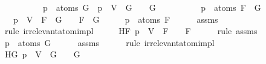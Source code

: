 \begin{isabellebody}
\ \ \ \ \ \ \ \ \ \ {\isachardoublequoteopen}p\ {\isasymnotin}\ atoms\ G\ {\isasymLongrightarrow}\ {\isasymA}{\isacharparenleft}p\ {\isacharcolon}{\isacharequal}\ V{\isacharparenright}\ {\isasymTurnstile}\ G\ {\isasymlongleftrightarrow}\ {\isasymA}\ {\isasymTurnstile}\ G{\isachardoublequoteclose}\isanewline
\ \ \ \ \ \ \ \ \ \ {\isachardoublequoteopen}p\ {\isasymnotin}\ atoms\ {\isacharparenleft}F\ \isactrlbold {\isasymrightarrow}\ G{\isacharparenright}{\isachardoublequoteclose}\isanewline
\ \ \ {\isachardoublequoteopen}{\isasymA}{\isacharparenleft}p\ {\isacharcolon}{\isacharequal}\ V{\isacharparenright}\ {\isasymTurnstile}\ {\isacharparenleft}F\ \isactrlbold {\isasymrightarrow}\ G{\isacharparenright}\ {\isasymlongleftrightarrow}\ {\isasymA}\ {\isasymTurnstile}\ {\isacharparenleft}F\ \isactrlbold {\isasymrightarrow}\ G{\isacharparenright}{\isachardoublequoteclose}\isanewline
%
\isadelimproof
%
\endisadelimproof
%
\isatagproof
{}\isamarkupfalse%
\ {\isacharminus}\isanewline
\ \ \isamarkupfalse%
\ {\isachardoublequoteopen}p\ {\isasymnotin}\ atoms\ F{\isachardoublequoteclose}\isanewline
\ \ \ \ \isamarkupfalse%
\ assms{\isacharparenleft}{}{\isacharparenright}\isanewline
\ \ \ \ \isamarkupfalse%
\ {\isacharparenleft}rule\ irrelevant{\isacharunderscore}atom{\isacharunderscore}imp{\isacharunderscore}l{}{\isacharparenright}\isanewline
\ \ \isamarkupfalse%
\ \isamarkupfalse%
\ HF{\isacharcolon}\ {\isachardoublequoteopen}{\isasymA}{\isacharparenleft}p\ {\isacharcolon}{\isacharequal}\ V{\isacharparenright}\ {\isasymTurnstile}\ F\ {\isasymlongleftrightarrow}\ {\isasymA}\ {\isasymTurnstile}\ F{\isachardoublequoteclose}\isanewline
\ \ \ \ \isamarkupfalse%
\ {\isacharparenleft}rule\ assms{\isacharparenleft}{}{\isacharparenright}{\isacharparenright}\isanewline
\ \ \isamarkupfalse%
\ {\isachardoublequoteopen}p\ {\isasymnotin}\ atoms\ G{\isachardoublequoteclose}\isanewline
\ \ \ \ \isamarkupfalse%
\ assms{\isacharparenleft}{}{\isacharparenright}\isanewline
\ \ \ \ \isamarkupfalse%
\ {\isacharparenleft}rule\ irrelevant{\isacharunderscore}atom{\isacharunderscore}imp{\isacharunderscore}l{}{\isacharparenright}\isanewline
\ \ \isamarkupfalse%
\ \isamarkupfalse%
\ HG{\isacharcolon}\ {\isachardoublequoteopen}{\isasymA}{\isacharparenleft}p\ {\isacharcolon}{\isacharequal}\ V{\isacharparenright}\ {\isasymTurnstile}\ G\ {\isasymlongleftrightarrow}\ {\isasymA}\ {\isasymTurnstile}\ G{\isachardoublequoteclose}\isanewline

\end{isabellebody}
